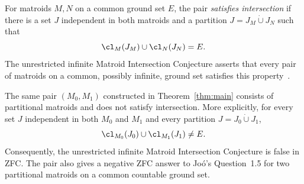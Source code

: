 For matroids $M,N$ on a common ground set $E$, the pair \emph{satisfies
intersection} if there is a set $J$ independent in both matroids and a
partition $J=J_M\dot\cup J_N$ such that
\[
 \cl_M(J_M)\cup\cl_N(J_N)=E.
\]
The unrestricted infinite Matroid Intersection Conjecture asserts that
every pair of matroids on a common, possibly infinite, ground set satisfies this
property~\cite[Definition~3.5 and Section~7]{BowlerCarmesin2015}.

\begin{corollary}\label{cor:intersection}
The same pair $(M_0,M_1)$ constructed in Theorem~\ref{thm:main} consists of
partitional matroids and does not satisfy intersection. More explicitly,
for every set $J$ independent in both $M_0$ and $M_1$ and every partition
$J=J_0\dot\cup J_1$,
\[
 \cl_{M_0}(J_0)\cup\cl_{M_1}(J_1)\ne E.
\]
Consequently, the unrestricted infinite Matroid Intersection Conjecture is
false in ZFC. The pair also gives a negative ZFC answer to Jo\'o's
Question~1.5 for two partitional matroids on a common countable ground set.
\end{corollary}

